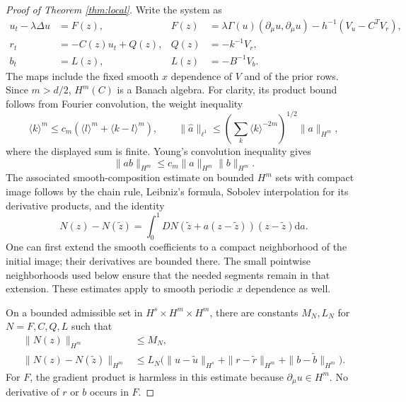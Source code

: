 \documentclass[11pt]{article}
\newcommand{\dd}{\mathrm d}
\begin{document}
\begin{proof}[Proof of Theorem \ref{thm:local}]
Write the system as
\begin{align}
 u_t-\lambda\Delta u&=F(z),&
 F(z)&=\lambda\Gamma(u)(\partial_\mu u,\partial_\mu u)
                  -h^{-1}(V_u-C^TV_r),\label{eq:F}\\
 r_t&=-C(z)u_t+Q(z),& Q(z)&=-k^{-1}V_r,\\
 b_t&=L(z),& L(z)&=-B^{-1}V_b.
\end{align}
The maps include the fixed smooth $x$ dependence of $V$ and of the prior rows. Since $m>d/2$, $H^m(C)$ is a Banach algebra. For clarity, its product bound follows from Fourier convolution, the weight inequality
\begin{equation}
 \langle k\rangle^m\leq c_m(\langle l\rangle^m+
                               \langle k-l\rangle^m),
 \qquad
 \|\widehat a\|_{\ell^1}\leq
 \left(\sum_k\langle k\rangle^{-2m}\right)^{1/2}\|a\|_{H^m},
\end{equation}
where the displayed sum is finite. Young's convolution inequality gives
\begin{equation}
 \|ab\|_{H^m}\leq c_m\|a\|_{H^m}\|b\|_{H^m}.
\end{equation}
The associated smooth-composition estimate on bounded $H^m$ sets with compact image follows by the chain rule, Leibniz's formula, Sobolev interpolation for its derivative products, and the identity
\begin{equation}
 N(z)-N(\widetilde z)
 =\int_0^1DN(\widetilde z+a(z-\widetilde z))(z-\widetilde z)\dd a.
\end{equation}
One can first extend the smooth coefficients to a compact neighborhood of the initial image; their derivatives are bounded there. The small pointwise neighborhoods used below ensure that the needed segments remain in that extension. These estimates apply to smooth periodic $x$ dependence as well.

On a bounded admissible set in $H^s\times H^m\times H^m$, there are constants $M_N,L_N$ for $N=F,C,Q,L$ such that
\begin{align}
 \|N(z)\|_{H^m}&\leq M_N,\\
 \|N(z)-N(\widetilde z)\|_{H^m}
 &\leq L_N\bigl(\|u-\widetilde u\|_{H^s}
              +\|r-\widetilde r\|_{H^m}
              +\|b-\widetilde b\|_{H^m}\bigr).
 \label{eq:nonlinearestimates}
\end{align}
For $F$, the gradient product is harmless in this estimate because $\partial_\mu u\in H^m$. No derivative of $r$ or $b$ occurs in $F$.


\end{proof}
\end{document}
